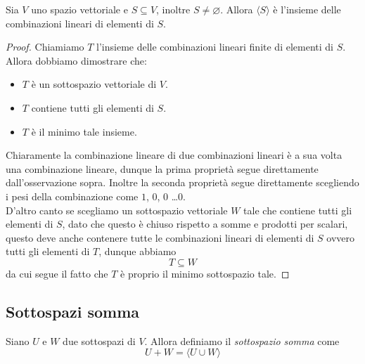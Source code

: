 \documentclass[11pt]{scrartcl}
\newcommand{\eset}{\varnothing}
\begin{document}
	\begin{theorem}
		Sia $V$ uno spazio vettoriale e $S\subseteq V$, inoltre $S \ne \eset$. Allora $\langle S \rangle$ è l'insieme delle combinazioni lineari di elementi di $S$.
	\end{theorem}
	\begin{proof}
		Chiamiamo $T$ l'insieme delle combinazioni lineari finite di elementi di $S$. Allora dobbiamo dimostrare che:
		\begin{itemize}
			\item $T$ è un sottospazio vettoriale di $V$. 
			\item $T$ contiene tutti gli elementi di $S$. 
			\item $T$ è il minimo tale insieme.
		\end{itemize}
		Chiaramente la combinazione lineare di due combinazioni lineari è a sua volta una combinazione lineare, dunque la prima proprietà segue direttamente dall'osservazione sopra. Inoltre la seconda proprietà segue direttamente scegliendo i pesi della combinazione come $1$, $0$, $0$ \dots $0$. \\
		D'altro canto se scegliamo un sottospazio vettoriale $W$ tale che contiene tutti gli elementi di $S$, dato che questo è chiuso rispetto a somme e prodotti per scalari, questo deve anche contenere tutte le combinazioni lineari di elementi di $S$ ovvero tutti gli elementi di $T$, dunque abbiamo
		$$T\subseteq W$$
		da cui segue il fatto che $T$ è proprio il minimo sottospazio tale.
	\end{proof}
	
	\subsection{Sottospazi somma}
	
	\begin{definition}
		Siano $U$ e $W$ due sottospazi di $V$. Allora definiamo il \textit{sottospazio somma} come
		$$U+W=\langle U \cup W\rangle$$
	\end{definition}
	
\end{document}
